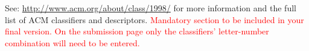 \documentclass{sig-alternate}
\newcommand\tabhead[1]{\small\textbf{#1}}
\begin{document}

See: \url{http://www.acm.org/about/class/1998/}
for more information and the full list of ACM classifiers
and descriptors. 
\textcolor{red}{Mandatory section to be included in your
final version. On the submission page only the classifiers'
letter-number combination will need to be entered.}


















\end{document}
